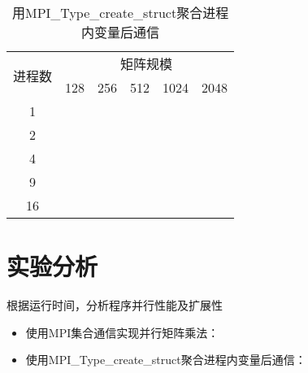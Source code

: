 \documentclass{SYSUReport}
\begin{document}
\begin{table}[H]
\centering
\caption{用MPI\_Type\_create\_struct聚合进程内变量后通信}
\label{表2}
\begin{tabular}{|c|lllll|}
\hline
\multirow{2}{*}{进程数} & \multicolumn{5}{c|}{矩阵规模}                                                                        \\ \cline{2-6} 
 & \multicolumn{1}{l|}{128} & \multicolumn{1}{l|}{256} & \multicolumn{1}{l|}{512} & \multicolumn{1}{l|}{1024} & 2048 \\ \hline
1                    & \multicolumn{1}{l|}{} & \multicolumn{1}{l|}{} & \multicolumn{1}{l|}{} & \multicolumn{1}{l|}{} &  \\ \hline
2                    & \multicolumn{1}{l|}{} & \multicolumn{1}{l|}{} & \multicolumn{1}{l|}{} & \multicolumn{1}{l|}{} &  \\ \hline
4                    & \multicolumn{1}{l|}{} & \multicolumn{1}{l|}{} & \multicolumn{1}{l|}{} & \multicolumn{1}{l|}{} &  \\ \hline
9                    & \multicolumn{1}{l|}{} & \multicolumn{1}{l|}{} & \multicolumn{1}{l|}{} & \multicolumn{1}{l|}{} &  \\ \hline
16                   & \multicolumn{1}{l|}{} & \multicolumn{1}{l|}{} & \multicolumn{1}{l|}{} & \multicolumn{1}{l|}{} &  \\ \hline
\end{tabular}
\end{table}


\section{实验分析}
根据运行时间，分析程序并行性能及扩展性
\begin{itemize}
    \item 使用MPI集合通信实现并行矩阵乘法：




    \item 使用MPI\_Type\_create\_struct聚合进程内变量后通信：





\end{itemize}
\end{document}
